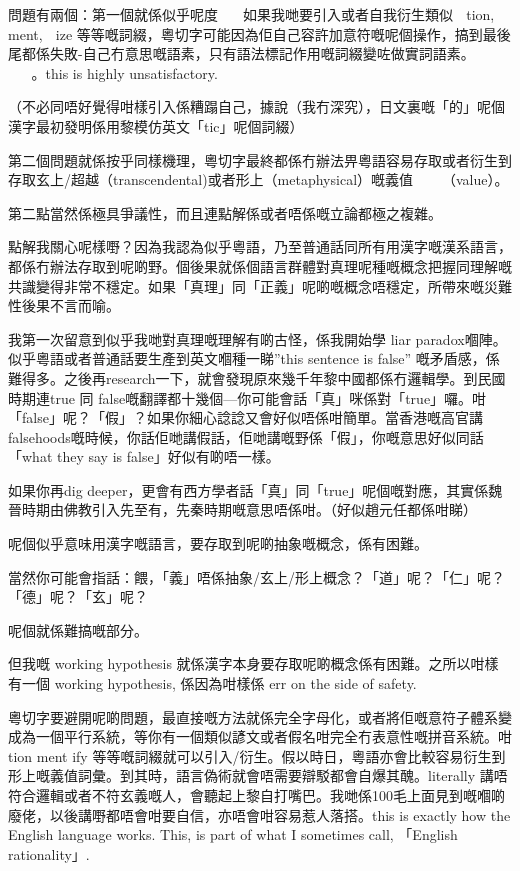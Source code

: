 問題有兩個：第一個就係似乎呢度 󱜱 如果我哋要引入或者自我衍生類似  tion,  ment,  ize 等等嘅詞綴，粵切字可能因為佢自己容許加意符嘅呢個操作，搞到最後尾都係失敗-自己冇意思嘅語素，只有語法標記作用嘅詞綴變咗做實詞語素。   。this is highly unsatisfactory.

（不必同唔好覺得咁樣引入係糟蹋自己，據說（我冇深究），日文裏嘅「的」呢個漢字最初發明係用黎模仿英文「tic」呢個詞綴）

第二個問題就係按乎同樣機理，粵切字最終都係冇辦法畀粵語容易存取或者衍生到存取玄上/超越（transcendental)或者形上（metaphysical）嘅義值  （value）。

第二點當然係極具爭議性，而且連點解係或者唔係嘅立論都極之複雜。

點解我關心呢樣嘢？因為我認為似乎粵語，乃至普通話同所有用漢字嘅漢系語言，都係冇辦法存取到呢啲野。個後果就係個語言群體對真理呢種嘅概念把握同理解嘅共識變得非常不穩定。如果「真理」同「正義」呢啲嘅概念唔穩定，所帶來嘅災難性後果不言而喻。

我第一次留意到似乎我哋對真理嘅理解有啲古怪，係我開始學 liar paradox嗰陣。似乎粵語或者普通話要生產到英文嗰種一睇”this sentence is false” 嘅矛盾感，係難得多。之後再research一下，就會發現原來幾千年黎中國都係冇邏輯學。到民國時期連true 同 false嘅翻譯都十幾個—你可能會話「真」咪係對「true」囉。咁「false」呢？「假」？如果你細心諗諗又會好似唔係咁簡單。當香港嘅高官講 falsehoods嘅時候，你話佢哋講假話，佢哋講嘅野係「假」，你嘅意思好似同話「what they say is false」好似有啲唔一樣。

如果你再dig deeper，更會有西方學者話「真」同「true」呢個嘅對應，其實係魏晉時期由佛教引入先至有，先秦時期嘅意思唔係咁。（好似趙元任都係咁睇）

呢個似乎意味用漢字嘅語言，要存取到呢啲抽象嘅概念，係有困難。

當然你可能會指話：餵，「義」唔係抽象/玄上/形上概念？「道」呢？「仁」呢？「德」呢？「玄」呢？

呢個就係難搞嘅部分。

但我嘅 working hypothesis 就係漢字本身要存取呢啲概念係有困難。之所以咁樣有一個 working hypothesis, 係因為咁樣係 err on the side of safety.

粵切字要避開呢啲問題，最直接嘅方法就係完全字母化，或者將佢嘅意符子體系變成為一個平行系統，等你有一個類似諺文或者假名咁完全冇表意性嘅拼音系統。咁 tion ment ify 等等嘅詞綴就可以引入/衍生。假以時日，粵語亦會比較容易衍生到形上嘅義值詞彙。到其時，語言偽術就會唔需要辯駁都會自爆其醜。literally 講唔符合邏輯或者不符玄義嘅人，會聽起上黎自打嘴巴。我哋係100毛上面見到嘅嗰啲廢佬，以後講嘢都唔會咁要自信，亦唔會咁容易惹人落搭。this is exactly how the English language works. This, is part of what I sometimes call, 「English rationality」.

